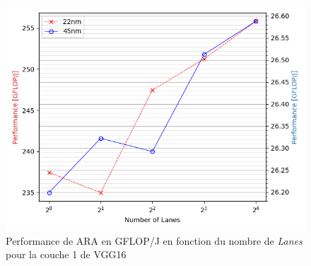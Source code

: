 \documentclass[11pt,letterpaper]{article}
\begin{document}
    \begin{figure}[H]
        \centering
        \includegraphics[width=\linewidth]{performance.png}
        \caption{Performance de ARA en GFLOP/J en fonction du nombre de \textit{Lanes} pour la couche 1 de VGG16}
        \label{fig:performance}
    \end{figure}
\end{document}
